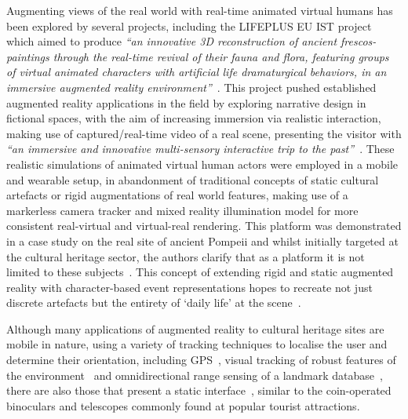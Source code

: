 Augmenting views of the real world with real-time animated virtual humans has been explored by several projects, including the LIFEPLUS EU IST project which aimed to produce \textit{``an innovative 3D reconstruction of ancient frescos-paintings through the real-time revival of their fauna and flora, featuring groups of virtual animated characters with artificial life dramaturgical behaviors, in an immersive augmented reality environment''}~\cite{Papagiannakis2004}. This project pushed established augmented reality applications in the field by exploring narrative design in fictional spaces, with the aim of increasing immersion via realistic interaction, making use of captured/real-time video of a real scene, presenting the visitor with \textit{``an immersive and innovative multi-sensory interactive trip to the past''}~\cite{Papagiannakis2005}. These realistic simulations of animated virtual human actors were employed in a mobile and wearable setup, in abandonment of traditional concepts of static cultural artefacts or rigid augmentations of real world features, making use of a markerless camera tracker and mixed reality illumination model for more consistent real-virtual and virtual-real rendering. This platform was demonstrated in a case study on the real site of ancient Pompeii and whilst initially targeted at the cultural heritage sector, the authors clarify that as a platform it is not limited to these subjects~\cite{Papagiannakis2007}. This concept of extending rigid and static augmented reality with character-based event representations hopes to recreate not just discrete artefacts but the entirety of `daily life' at the scene~\cite{Papagiannakis2009}.

Although many applications of augmented reality to cultural heritage sites are mobile in nature, using a variety of tracking techniques to localise the user and determine their orientation, including GPS~\cite{vlahakis:archeoguide}, visual tracking of robust features of the environment~\cite{Kim2009} and omnidirectional range sensing of a landmark database~\cite{Taketomi2011}, there are also those that present a static interface~\cite{Weng2012}, similar to the coin-operated binoculars and telescopes commonly found at popular tourist attractions.


